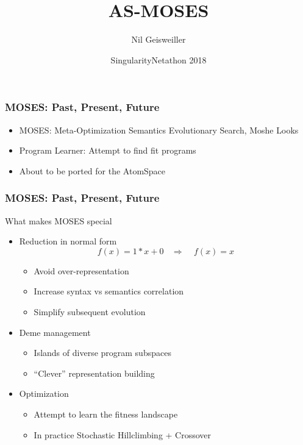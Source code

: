 \documentclass{beamer}
\title{AS-MOSES}
\author{Nil Geisweiller}
\institute[OpenCog Foundation] %
{
  OpenCog Foundation
}
\date[SingularityNetathon 2018] %
{SingularityNetathon 2018}
\begin{document}
\frame
{
  \maketitle
}


\begin{frame}[fragile]
  \frametitle{MOSES: Past, Present, Future}

  \begin{itemize}
  \item MOSES: Meta-Optimization Semantics Evolutionary Search, Moshe
    Looks
  \item Program Learner: Attempt to find fit programs
  \item About to be ported for the AtomSpace
  \end{itemize}
\end{frame}

\begin{frame}[fragile]
  \frametitle{MOSES: Past, Present, Future}

  What makes MOSES special
  \begin{itemize}
  \item<+-> Reduction in normal form\\
    $$f(x) = 1*x + 0\ \ \ \ \Rightarrow\ \ \ \ \ f(x) = x$$
    \begin{itemize}
    \item Avoid over-representation
    \item Increase syntax vs semantics correlation
    \item Simplify subsequent evolution
    \end{itemize}
  \item<+-> Deme management
    \begin{itemize}
    \item Islands of diverse program subspaces
    \item ``Clever'' representation building
    \end{itemize}
  \item<+-> Optimization
    \begin{itemize}
    \item Attempt to learn the fitness landscape
    \item In practice Stochastic Hillclimbing + Crossover
    \end{itemize}
  \end{itemize}

\end{frame}
\end{document}
